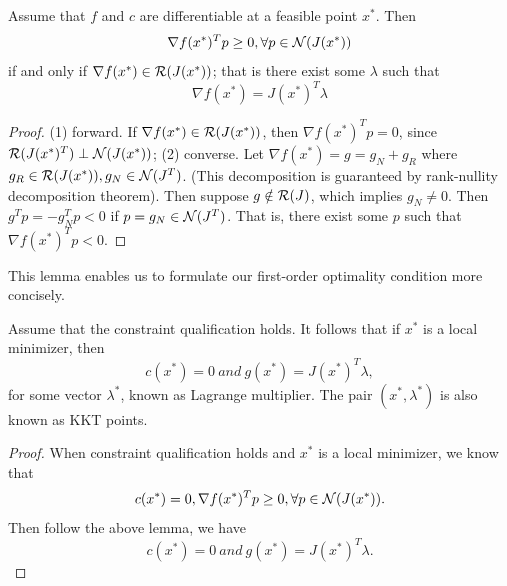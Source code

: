 \begin{refsection}
\fi


\begin{lemma}\cite[lec 4]{Robinson2015nonlinear2}
Assume that $f$ and $c$ are differentiable at a feasible point $x^*$. Then
$$\nabla f(x^*)^T p \geq 0, \forall p \in \mathcal{N}(J(x^*)) $$ if and only if $\nabla f(x^*) \in \mathcal{R}(J(x^*))$;
that is there exist some $\lambda$ such that $$\nabla f(x^*) = J(x^*)^T\lambda$$
\end{lemma}
\begin{proof}
(1) forward. If $\nabla f(x^*) \in \mathcal{R}(J(x^*))$, then $\nabla f(x^*)^T p = 0$, since $\mathcal{R}(J(x^*)^T) \perp \mathcal{N}(J(x^*))$;
(2) converse. Let $\nabla f(x^*) = g = g_N + g_R$ where $ g_R \in \mathcal{R}(J(x^*)),g_N \in \mathcal{N}(J^T)$. (This decomposition is guaranteed by rank-nullity decomposition theorem). Then suppose $g \notin \mathcal{R}(J)$, which implies $g_N \neq 0$. Then $g^T p = -g_N^Tp < 0$ if $p=g_N \in \mathcal{N}(J^T)$. That is, there exist some $p$ such that $\nabla f(x^*)^T p < 0$.
\end{proof}

\begin{remark}
This lemma enables us to formulate our first-order optimality condition more concisely.
\end{remark}

\begin{theorem}\label{ch:constrained-nonlinear-optimization:firstordernecessaryconditionequalityconstraint}
Assume that the constraint qualification holds. It follows that if $x^*$ is a local minimizer, then 
$$c(x^*) = 0 ~and~ g(x^*) = J(x^*)^T\lambda,$$
for some vector $\lambda^*$, known as Lagrange multiplier. The pair $(x^*,\lambda^*)$ is also known as KKT points.
\end{theorem}
\begin{proof}
When constraint qualification holds and $x^*$ is a local minimizer, we know that
$$c(x^*) = 0, \nabla f(x^*)^T p \geq 0, \forall p \in \mathcal{N}(J(x^*)).$$
Then follow the above lemma, we have
$$c(x^*) = 0 ~and~ g(x^*) = J(x^*)^T\lambda.$$ 
\end{proof}


\end{refsection}
